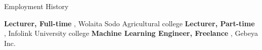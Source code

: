 \begin{rubric}{Employment History}

\entry*[2016-2021] \textbf{Lecturer, Full-time }, Wolaita Sodo Agricultural college
\entry*[2016-2021] \textbf{Lecturer, Part-time }, Infolink University college
\entry*[2020] \textbf{Machine Learning Engineer, Freelance }, Gebeya Inc. 

\end{rubric}